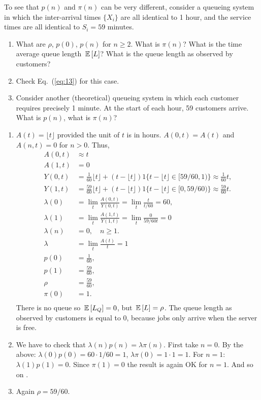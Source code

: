 \begin{question}\label{ex:8}
  To see that $p(n)$ and $\pi(n)$ can be very different, consider a
  queueing system in which the inter-arrival times $\{X_i\}$ are all
  identical to 1 hour, and the service times are all identical to
  $S_i=59$ minutes.
\begin{enumerate}
\item What are $\rho$, $p(0)$, $p(n)$ for $n\geq 2$. What is $\pi(n)$?
  What is the time average queue length $\,\mathbb{E}\left[L\right]$? What is the queue
  length as observed by customers?
\item Check Eq.~(\ref{eq:13}) for this case.
\item Consider another (theoretical) queueing system in which each
  customer requires precisely 1 minute. At the start of each hour, 59
  customers arrive. What is $p(n)$, what is $\pi(n)$?
\end{enumerate}
  \begin{solution}
\begin{enumerate}
\item $A(t)=\lfloor t\rfloor$ provided the unit of $t$ is in
  hours. $A(0,t)=A(t)$ and $A(n,t)=0$ for $n>0$.  Thus, 
  \begin{equation*}
    \begin{split}
A(0,t) &\approx t \\
A(1,t) & = 0 \\
    Y(0,t)&= \frac 1{60} \lfloor t \rfloor + (t-\lfloor t \rfloor) 1\{t-\lfloor t \rfloor \in[59/60, 1)\} \approx \frac{1}{60}t, \\
    Y(1,t)&= \frac{59}{60} \lfloor t \rfloor + (t-\lfloor t \rfloor) 1\{t-\lfloor t \rfloor     \in[0,59/60)\} \approx \frac{59}{60}t. \\
\lambda(0) &= \lim_t \frac{A(0,t)}{Y(0,t)} = \lim_t \frac{t}{t/60} = 60, \\
\lambda(1) &= \lim_t \frac{A(1,t)}{Y(1,t)} = \lim_t\frac{0}{59/60 t} = 0 \\
\lambda(n) &= 0, \quad n\geq 1. \\
\lambda &= \lim_t \frac{A(t)}t  = 1 \\
p(0)  &= \frac{1}{60}, \\
p(1)  &= \frac{59}{60}, \\
\rho  &= \frac{59}{60}, \\
\pi(0)  &= 1. \\
    \end{split}
  \end{equation*}
  There is no queue so $\,\mathbb{E}\left[L_Q\right] = 0$, but $\,\mathbb{E}\left[L\right] = \rho$.  The queue
  length as observed by customers is equal to 0, because jobs only
  arrive when the server is free.
\item We have to check that $\lambda(n) p(n) = \lambda \pi(n)$.  First
  take $n=0$. By the above: $\lambda(0) p(0) = 60\cdot 1/60 = 1$,
  $\lambda \pi(0) = 1\cdot 1 = 1$.  For $n=1$: $\lambda(1) p(1) = 0$. Since $\pi(1)=0$ the result is again OK for $n=1$. And so on .
\item Again $\rho=59/60$.


\end{enumerate}
\end{solution}
\end{question}
